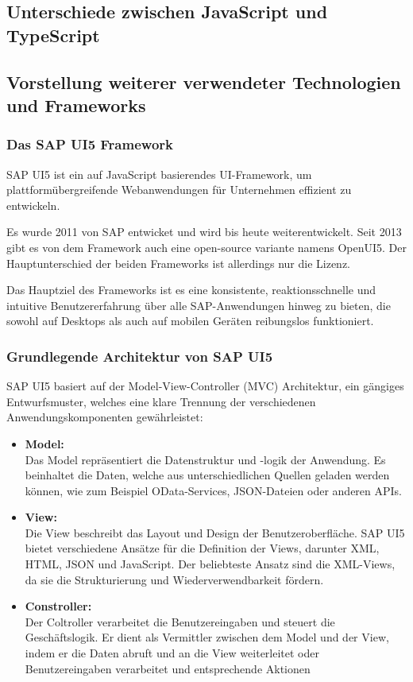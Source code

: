 \subsection[Unterschiede zwischen JavaScript und TypeScript]{Unterschiede zwischen JavaScript und TypeScript}

\subsection[Vorstellung weiterer verwendeter Technologien und Frameworks]{Vorstellung weiterer verwendeter Technologien und Frameworks}
\subsubsection[Das SAP UI5 Framework]{Das SAP UI5 Framework}
SAP UI5 ist ein auf JavaScript basierendes UI-Framework, um plattformübergreifende Webanwendungen für Unternehmen effizient zu entwickeln.

Es wurde 2011 von SAP entwicket und wird bis heute weiterentwickelt. Seit 2013 gibt es von dem Framework auch eine open-source variante namens OpenUI5. Der Hauptunterschied der beiden Frameworks ist allerdings nur die Lizenz.

Das Hauptziel des Frameworks ist es eine konsistente, reaktionsschnelle und intuitive Benutzererfahrung über alle SAP-Anwendungen hinweg zu bieten, die sowohl auf Desktops als auch auf mobilen Geräten reibungslos funktioniert.

\subsubsection[Grundlegende Architektur von SAP UI5]{Grundlegende Architektur von SAP UI5}
SAP UI5 basiert auf der Model-View-Controller (MVC) Architektur, ein gängiges Entwurfsmuster, welches eine klare Trennung der verschiedenen Anwendungskomponenten gewährleistet:
\begin{itemize}
    \item \textbf{Model:} \\
    Das Model repräsentiert die Datenstruktur und -logik der Anwendung. Es beinhaltet die Daten, welche aus unterschiedlichen Quellen geladen werden können, wie zum Beispiel OData-Services, JSON-Dateien oder anderen APIs.
    \item \textbf{View:} \\
    Die View beschreibt das Layout und Design der Benutzeroberfläche. SAP UI5 bietet verschiedene Ansätze für die Definition der Views, darunter XML, HTML, JSON und JavaScript.
    Der beliebteste Ansatz sind die XML-Views, da sie die Strukturierung und Wiederverwendbarkeit fördern.
    \item \textbf{Constroller:} \\
    Der Coltroller verarbeitet die Benutzereingaben und steuert die Geschäftslogik.
    Er dient als Vermittler zwischen dem Model und der View, indem er die Daten abruft und an die View weiterleitet oder Benutzereingaben verarbeitet und entsprechende Aktionen 
\end{itemize}

